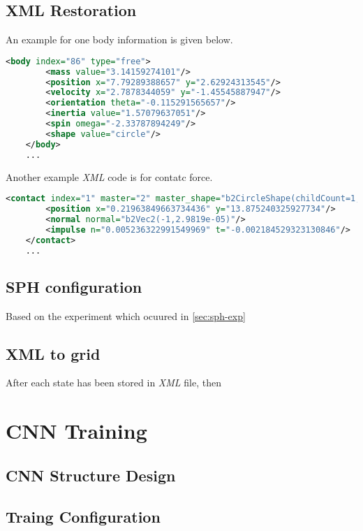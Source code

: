 \subsection{XML Restoration}

An example for one body information is given below.
\begin{lstlisting}[language=XML]
    <body index="86" type="free">
        <mass value="3.14159274101"/>
        <position x="7.79289388657" y="2.62924313545"/>
        <velocity x="2.7878344059" y="-1.45545887947"/>
        <orientation theta="-0.115291565657"/>
        <inertia value="1.57079637051"/>
        <spin omega="-2.33787894249"/>
        <shape value="circle"/>
    </body>
    ...
\end{lstlisting}

Another example \textit{XML} code is for contatc force.
\begin{lstlisting}[language=XML]
    <contact index="1" master="2" master_shape="b2CircleShape(childCount=1, pos=b2Vec2(0,0), radius=1.2000000476837158, type=0,)" slave="97" slave_shape="b2CircleShape(childCount=1, pos=b2Vec2(0,0), radius=1.2000000476837158, type=0, )">
        <position x="0.21963849663734436" y="13.875240325927734"/>
        <normal normal="b2Vec2(-1,2.9819e-05)"/>
        <impulse n="0.005236322991549969" t="-0.002184529323130846"/>
    </contact>
    ...
\end{lstlisting}

\subsection{SPH configuration}
Based on the experiment which ocuured in \ref{sec:sph-exp}
\subsection{XML to grid}
After each state has been stored in \textit{XML} file, then 


\section{CNN Training}

\subsection{CNN  Structure Design}

\subsection{Traing Configuration}
